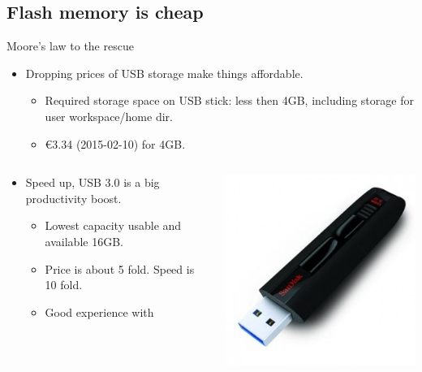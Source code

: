 \subsection[Flash]{Flash memory is cheap}
\begin{frame}{Moore's law to the rescue}
  
  \begin{itemize}
  \item Dropping prices of USB storage make things affordable.
    \begin{itemize}
    \item Required storage space on USB stick: less then 4GB,
      including storage for user workspace/home dir.
    \item \euro 3.34 (2015-02-10) for 4GB.
    \end{itemize}
  \end{itemize}
  \begin{columns}
    \begin{column}{.65\textwidth}
      \begin{itemize}
      \item Speed up, USB 3.0 is a big productivity boost.
        \begin{itemize}
        \item Lowest capacity usable and available 16GB.
        \item Price is about 5 fold. Speed is 10 fold.
        \item Good experience with 
        \end{itemize}
      \end{itemize}
    \end{column}
    \begin{column}{.35\textwidth}
      \includegraphics[width=\textwidth]{figures/SDCZ80-300x300.jpg}

\end{column}
\end{columns}
\end{frame}
